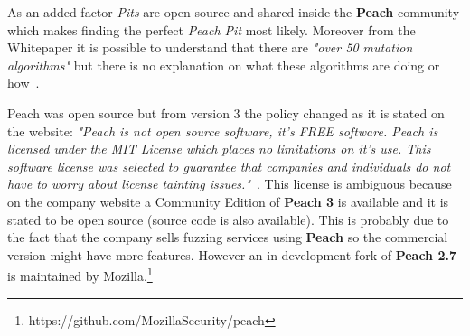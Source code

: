 \documentclass[../main.tex]{subfiles}
\begin{document}
As an added factor \textit{Pits} are open source and shared inside the \textbf{Peach} community which makes finding the perfect \textit{Peach Pit} most likely. Moreover from the Whitepaper it is possible to understand that there are \textit{"over 50 mutation algorithms"} but there is no explanation on what these algorithms are doing or how~\cite{peach}.

Peach was open source but from version 3 the policy changed as it is stated on the website: \textit{"Peach is not open source software, it’s FREE software. Peach is licensed under the MIT License which places no limitations on it’s use. This software license was selected to guarantee that companies and individuals do not have to worry about license tainting issues."}~\cite{peachlicense}. This license is ambiguous because on the company website a Community Edition of \textbf{Peach 3} is available and it is stated to be open source (source code is also available). This is probably due to the fact that the company sells fuzzing services using \textbf{Peach} so the commercial version might have more features. However an in development fork of \textbf{Peach 2.7} is maintained by Mozilla.\footnote{https://github.com/MozillaSecurity/peach}
\end{document}
